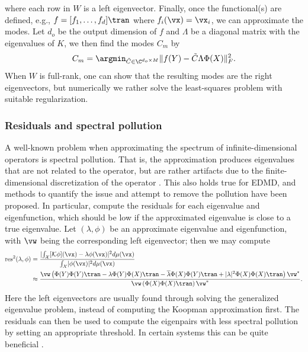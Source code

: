 \documentclass{article}
\begin{document}
where each row in \(W\) is a left eigenvector. Finally, once the functional(s) are defined, e.g., \(f=[f_1, \dots, f_d]\tran\) where \(f_i(\vx) = \vx_i\), we can approximate the modes. Let \(d_o\) be the output dimension of \(f\) and \(\Lambda\) be a diagonal matrix with the eigenvalues of \(K\), we then find the modes \(C_m\) by
\begin{align}\label{eq:koopman_modes}
    C_m = \argmin_{\Tilde C \in \C^{d_o \times M}} \lVert f(Y) - \Tilde C \Lambda \Phi(X) \rVert_F^2.
\end{align}
When \(W\) is full-rank, one can show that the resulting modes are the right eigenvectors, but numerically we rather solve the least-squares problem with suitable regularization. 

\subsubsection{Residuals and spectral pollution}\label{sec:res_spec}
A well-known problem when approximating the spectrum of infinite-dimensional operators is spectral pollution. That is, the approximation produces eigenvalues that are not related to the operator, but are rather artifacts due to the finite-dimensional discretization of the operator \citep{lewin-2009,colbrook-2019}. This also holds true for EDMD, and methods to quantify the issue and attempt to remove the pollution have been proposed. In particular, \citet{colbrook-2021} compute the residuals for each eigenvalue and eigenfunction, which should be low if the approximated eigenvalue is close to a true eigenvalue. Let \((\lambda, \phi)\) be an approximate eigenvalue and eigenfunction, with \(\vw\) being the corresponding left eigenvector; then we may compute
\begin{align*}
    \text{res}^2(\lambda, \phi) &= \frac{\lvert\int_{\mathcal{X}} [\mathcal{K}\phi](\vx) - \lambda \phi(\vx)\rvert^2 d\mu(\vx)}{\int_{\mathcal{X}} \lvert \phi(\vx)\rvert^2d\mu(\vx)}\\ 
    &\approx \frac{\vw \left(\Phi(Y) \Phi(Y)\tran - \lambda \Phi(Y)\Phi(X)\tran - \overline{\lambda} \Phi(X)
    \Phi(Y)\tran + \lvert\lambda\rvert^2 \Phi(X)\Phi(X)\tran\right) \vw^*}{\vw \left(\Phi(X)\Phi(X)\tran \right)\vw^*}.
\end{align*}
Here the left eigenvectors are usually found through solving the generalized eigenvalue problem, instead of computing the Koopman approximation first. The residuals can then be used to compute the eigenpairs with less spectral pollution by setting an appropriate threshold. In certain systems this can be quite beneficial \citep{colbrook-2021}.
\end{document}
